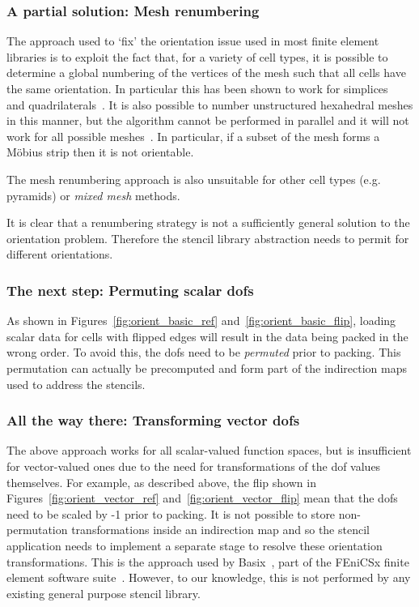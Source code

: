 \subsubsection{A partial solution: Mesh renumbering}

The approach used to `fix' the orientation issue used in most finite element libraries is to exploit the fact that, for a variety of cell types, it is possible to determine a global numbering of the vertices of the mesh such that all cells have the same orientation.
In particular this has been shown to work for simplices~\cite{rognesEfficientAssemblyDiv2010} and quadrilaterals~\cite{agelekOrientingEdgesUnstructured2017,homolyaParallelEdgeOrientation2016}.
It is also possible to number unstructured hexahedral meshes in this manner, but the algorithm cannot be performed in parallel and it will not work for all possible meshes~\cite{agelekOrientingEdgesUnstructured2017}.
In particular, if a subset of the mesh forms a Möbius strip then it is not orientable.

The mesh renumbering approach is also unsuitable for other cell types (e.g. pyramids) or \textit{mixed mesh} methods.

It is clear that a renumbering strategy is not a sufficiently general solution to the orientation problem.
Therefore the stencil library abstraction needs to permit for different orientations.

\subsubsection{The next step: Permuting scalar \glspl{dof}}

As shown in Figures~\ref{fig:orient_basic_ref} and~\ref{fig:orient_basic_flip}, loading scalar data for cells with flipped edges will result in the data being packed in the wrong order.
To avoid this, the \glspl{dof} need to be \textit{permuted} prior to packing.
This permutation can actually be precomputed and form part of the indirection maps used to address the stencils.

\subsubsection{All the way there: Transforming vector \glspl{dof}}

The above approach works for all scalar-valued function spaces, but is insufficient for vector-valued ones due to the need for transformations of the \gls{dof} values themselves.
For example, as described above, the flip shown in Figures~\ref{fig:orient_vector_ref} and~\ref{fig:orient_vector_flip} mean that the \glspl{dof} need to be scaled by -1 prior to packing.
It is not possible to store non-permutation transformations inside an indirection map and so the stencil application needs to implement a separate stage to resolve these orientation transformations.
This is the approach used by Basix~\cite{scroggsConstructionArbitraryOrder2021,scroggsBasixRuntimeFinite2022}, part of the FEniCSx finite element software suite~\cite{loggAutomatedSolutionDifferential2012,AlnaesBlechta2015a}.
However, to our knowledge, this is not performed by any existing general purpose stencil library.
